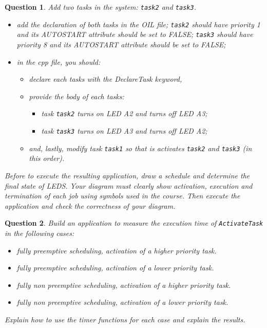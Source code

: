 \documentclass[11pt]{report}
\newtheorem{ex}{Question}
\begin{document}
\begin{ex}
    Add two tasks in the system: \texttt{task2} and \texttt{task3}.
    \begin{itemize}
        \item add the declaration of both tasks in the OIL file; \texttt{task2} should have priority 1 and its AUTOSTART attribute should be set to FALSE; \texttt{task3} should have priority 8 and its AUTOSTART attribute should be set to FALSE;
        \item in the cpp file, you should:
            \begin{itemize}
                \item declare each tasks with the DeclareTask keyword,
                \item provide the body of each tasks:
                    \begin{itemize}
                        \item task \texttt{task2} turns on LED A2 and turns off LED A3;
                        \item task \texttt{task3} turns on LED A3 and turns off LED A2;
                    \end{itemize}
                \item and, lastly, modify task \texttt{task1} so that is activates \texttt{task2} and \texttt{task3} (in this order).
            \end{itemize}
    \end{itemize}

    Before to execute the resulting application, draw a schedule and determine the final state of LEDS.
    Your diagram must clearly show activation, execution and termination of each job using symbols used in the course.
    Then execute the application and check the correctness of your diagram.
\end{ex}

\begin{ex}
    Build an application to measure the execution time of \texttt{ActivateTask} in the following cases:
    \begin{itemize}
        \item fully preemptive scheduling, activation of a higher priority task.
        \item fully preemptive scheduling, activation of a lower priority task.
        \item fully non preemptive scheduling, activation of a higher priority task.
        \item fully non preemptive scheduling, activation of a lower priority task.
    \end{itemize}

    Explain how to use the timer functions for each case and explain the results.
\end{ex}
\end{document}
